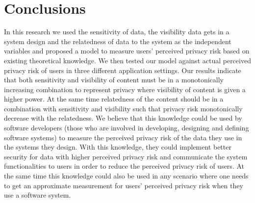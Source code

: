 \documentclass[10pt]{article}
\newcommand{\sansserifformat}[1]{\fontfamily{cmss}{ #1}}%
\begin{document}
\section{Conclusions}
In this research we used the sensitivity of data, the visibility data gets in a system design and the relatedness of data to the system as the independent variables and proposed a model to measure users' perceived privacy risk based on existing theoretical knowledge. We then tested our model against actual perceived privacy risk of users in three different application settings. Our results indicate that both sensitivity and visibility of content must be in a monotonically increasing combination to represent privacy where visibility of content is given a higher power. At the same time relatedness of the content should be in a combination with sensitivity and visibility such that privacy risk monotonically decrease with the relatedness. We believe that this knowledge could be used by software developers (those who are involved in developing, designing and defining software systems) to measure the perceived privacy risk of the data they use in the systems they design. With this knowledge, they could implement better security for data with higher perceived privacy risk and communicate the system functionalities to users in order to reduce the perceived privacy risk of users. At the same time this knowledge could also be used in any scenario where one needs to get an approximate measurement for users' perceived privacy risk when they use a software system.







\footnotesize


\end{document}
